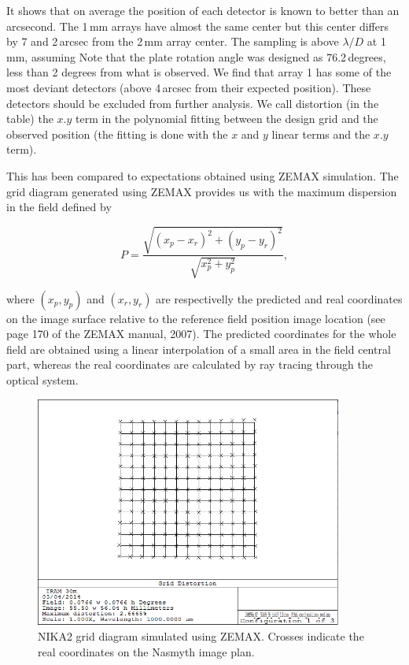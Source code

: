 It shows that on average the position of each detector is known to better than
an arcsecond. The 1\,mm arrays have almost the same center but this center
differs by 7 and 2\,arcsec from the 2\,mm array center. The sampling is above
$\lambda/D$ at 1\,mm, assuming  Note that
the plate rotation angle was designed as 76.2\,degrees, less than 2
degrees from what is observed. We find that array 1
has some of the most deviant detectors (above 4\,arcsec from their expected
position). These detectors should be excluded from further analysis. We call
distortion (in the table) the $x.y$ term in the polynomial fitting between the
design grid and the observed position (the fitting is done with the $x$ and
$y$ linear terms and the $x.y$ term). 

This has been compared to expectations obtained using ZEMAX
simulation. The grid diagram generated using ZEMAX provides us with
the maximum dispersion in the field defined by

\begin{equation}
P = \frac{\sqrt{(x_p - x_r)^2 + (y_p - y_r)^2}}{\sqrt{x_p^2 + y_p^2}},
\end{equation}

where $(x_p, y_p)$ and $(x_r, y_r)$ are respectivelly the predicted
and real coordinates on the image surface relative to the reference
field position image location (see page 170 of the ZEMAX manual, 2007).
The predicted coordinates for the whole field are obtained using a
linear interpolation of a small area in the field central part,
whereas the real coordinates are calculated by ray tracing through the
optical system.

\begin{figure}[ht] 
\begin{center}
\includegraphics[width=0.9\textwidth]{Figures/NIKA2_Final_grid.png}
\caption[Simulated FOV grid]{NIKA2 grid diagram simulated using ZEMAX. Crosses indicate
  the real coordinates on the Nasmyth image plan.   }
 \label{fig:fov_grid_distortion_zemax}
\end{center}
\end{figure}

